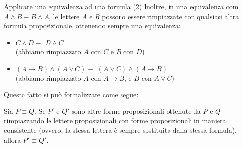 \documentclass[10pt,dvipsnames]{beamer}
\begin{document}
\begin{frame}{Applicare una equivalenza ad una formula (2)}
    Inoltre, in una equivalenza com $A \wedge B \equiv B \wedge A$, le lettere $A$ e $B$ possono essere rimpiazzate con qualsiasi altra formula proposizionale, ottenendo sempre una equivalenza:
    \begin{itemize}
        \item $C \wedge D \equiv$ \pause $D \wedge C$ \\
                (abbiamo rimpiazzato $A$ con $C$ e $B$ con $D$)
        \item $(A \to B) \wedge (A \vee C) \equiv$ \pause $(A \vee C) \wedge (A \to B)$\\
            (abbiamo rimpiazzato $A$ con $A \to B$, e $B$ con $A \vee C$)
    \end{itemize}

    \pause\medskip
    Questo fatto si può formalizzare come segue:
    \begin{theorem}
        Sia $P \equiv Q$. Se $P'$ e $Q'$ sono altre forme proposizionali ottenute da $P$ e $Q$ rimpiazzando le lettere proposizionali con forme proposizionali in maniera consistente (ovvero, la stessa lettera è sempre sostituita dalla stessa formula), allora $P' \equiv Q'$.
    \end{theorem}
\end{frame}


\end{document}
